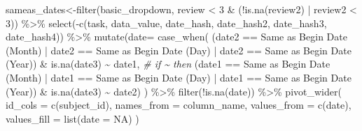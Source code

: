 \documentclass[
]{article}
\newenvironment{Shaded}{\begin{snugshade}}{\end{snugshade}}
\newcommand{\AttributeTok}[1]{\textcolor[rgb]{0.77,0.63,0.00}{#1}}
\newcommand{\CommentTok}[1]{\textcolor[rgb]{0.56,0.35,0.01}{\textit{#1}}}
\newcommand{\ConstantTok}[1]{\textcolor[rgb]{0.00,0.00,0.00}{#1}}
\newcommand{\DecValTok}[1]{\textcolor[rgb]{0.00,0.00,0.81}{#1}}
\newcommand{\FunctionTok}[1]{\textcolor[rgb]{0.00,0.00,0.00}{#1}}
\newcommand{\NormalTok}[1]{#1}
\newcommand{\OtherTok}[1]{\textcolor[rgb]{0.56,0.35,0.01}{#1}}
\newcommand{\SpecialCharTok}[1]{\textcolor[rgb]{0.00,0.00,0.00}{#1}}
\newcommand{\StringTok}[1]{\textcolor[rgb]{0.31,0.60,0.02}{#1}}
\begin{document}
\begin{Shaded}
\begin{Highlighting}[]
\NormalTok{sameas\_dates}\OtherTok{\textless{}{-}}\FunctionTok{filter}\NormalTok{(basic\_dropdown, review }\SpecialCharTok{\textless{}} \DecValTok{3} \SpecialCharTok{\&}\NormalTok{ (}\SpecialCharTok{!}\FunctionTok{is.na}\NormalTok{(review2) }\SpecialCharTok{|}\NormalTok{ review2 }\SpecialCharTok{\textless{}} \DecValTok{3}\NormalTok{)) }\SpecialCharTok{\%\textgreater{}\%}
  \FunctionTok{select}\NormalTok{(}\SpecialCharTok{{-}}\FunctionTok{c}\NormalTok{(task, data\_value, date\_hash, date\_hash2, date\_hash3, date\_hash4)) }\SpecialCharTok{\%\textgreater{}\%}
  \FunctionTok{mutate}\NormalTok{(}\AttributeTok{date=} \FunctionTok{case\_when}\NormalTok{( }
\NormalTok{    (date2 }\SpecialCharTok{==} \StringTok{\textquotesingle{}Same as Begin Date (Month)\textquotesingle{}} \SpecialCharTok{|}\NormalTok{ date2 }\SpecialCharTok{==} \StringTok{\textquotesingle{}Same as Begin Date (Day)\textquotesingle{}} \SpecialCharTok{|}\NormalTok{ date2 }\SpecialCharTok{==} \StringTok{\textquotesingle{}Same as Begin Date (Year)\textquotesingle{}}\NormalTok{) }\SpecialCharTok{\&} \FunctionTok{is.na}\NormalTok{(date3)   }\SpecialCharTok{\textasciitilde{}}\NormalTok{ date1, }\CommentTok{\# if \textasciitilde{} then }
\NormalTok{    (date1 }\SpecialCharTok{==} \StringTok{\textquotesingle{}Same as Begin Date (Month)\textquotesingle{}} \SpecialCharTok{|}\NormalTok{ date1 }\SpecialCharTok{==} \StringTok{\textquotesingle{}Same as Begin Date (Day)\textquotesingle{}} \SpecialCharTok{|}\NormalTok{ date1 }\SpecialCharTok{==} \StringTok{\textquotesingle{}Same as Begin Date (Year)\textquotesingle{}}\NormalTok{) }\SpecialCharTok{\&} \FunctionTok{is.na}\NormalTok{(date3)   }\SpecialCharTok{\textasciitilde{}}\NormalTok{ date2)}
\NormalTok{  )  }\SpecialCharTok{\%\textgreater{}\%} 
   \FunctionTok{filter}\NormalTok{(}\SpecialCharTok{!}\FunctionTok{is.na}\NormalTok{(date))  }\SpecialCharTok{\%\textgreater{}\%} \FunctionTok{pivot\_wider}\NormalTok{(}
                \AttributeTok{id\_cols =} \FunctionTok{c}\NormalTok{(subject\_id),}
                    \AttributeTok{names\_from =}\NormalTok{ column\_name, }
                     \AttributeTok{values\_from =} \FunctionTok{c}\NormalTok{(date), }
                     \AttributeTok{values\_fill =} \FunctionTok{list}\NormalTok{(}\AttributeTok{date =} \ConstantTok{NA}\NormalTok{) )}


\end{Highlighting}
\end{Shaded}
\end{document}
